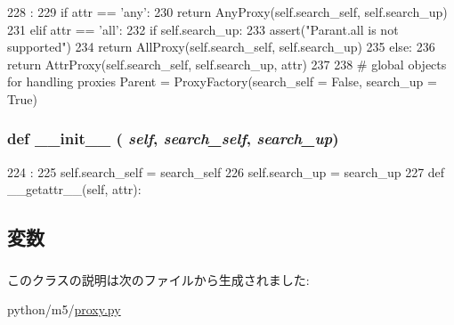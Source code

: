 \begin{DoxyCode}
228                                :
229         if attr == 'any':
230             return AnyProxy(self.search_self, self.search_up)
231         elif attr == 'all':
232             if self.search_up:
233                 assert("Parant.all is not supported")
234             return AllProxy(self.search_self, self.search_up)
235         else:
236             return AttrProxy(self.search_self, self.search_up, attr)
237 
238 # global objects for handling proxies
Parent = ProxyFactory(search_self = False, search_up = True)
\end{DoxyCode}
\hypertarget{classm5_1_1proxy_1_1ProxyFactory_ac775ee34451fdfa742b318538164070e}{
\subsubsection[{\_\-\_\-init\_\-\_\-}]{\setlength{\rightskip}{0pt plus 5cm}def \_\-\_\-init\_\-\_\- ( {\em self}, \/   {\em search\_\-self}, \/   {\em search\_\-up})}}
\label{classm5_1_1proxy_1_1ProxyFactory_ac775ee34451fdfa742b318538164070e}



\begin{DoxyCode}
224                                               :
225         self.search_self = search_self
226         self.search_up = search_up
227 
    def __getattr__(self, attr):
\end{DoxyCode}


\subsection{変数}
\hypertarget{classm5_1_1proxy_1_1ProxyFactory_a32a4d71671dbadcd7ef6fcded5e362a7}{
\subsubsection[{search\_\-self}]{}}
\label{classm5_1_1proxy_1_1ProxyFactory_a32a4d71671dbadcd7ef6fcded5e362a7}
\hypertarget{classm5_1_1proxy_1_1ProxyFactory_ac821d07260a7b10cb5a21bd8029f22f4}{
\subsubsection[{search\_\-up}]{}}
\label{classm5_1_1proxy_1_1ProxyFactory_ac821d07260a7b10cb5a21bd8029f22f4}


このクラスの説明は次のファイルから生成されました:\begin{DoxyCompactItemize}
\item 
python/m5/\hyperlink{proxy_8py}{proxy.py}\end{DoxyCompactItemize}
